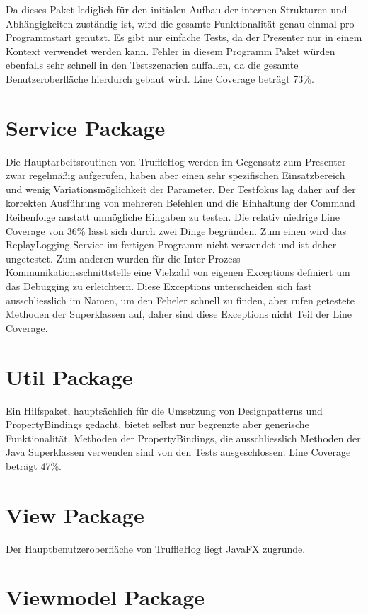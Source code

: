 Da dieses Paket lediglich für den initialen Aufbau der internen Strukturen und Abhängigkeiten zuständig ist, wird die gesamte Funktionalität genau einmal pro Programmstart genutzt. Es gibt nur einfache Tests, da der Presenter nur in einem Kontext verwendet werden kann. Fehler in diesem Programm Paket würden ebenfalls sehr schnell in den Testszenarien auffallen, da die gesamte Benutzeroberfläche hierdurch gebaut wird. Line Coverage beträgt 73\%.

\section{Service Package}

Die Hauptarbeitsroutinen von TruffleHog werden im Gegensatz zum Presenter zwar regelmäßig aufgerufen, haben aber einen sehr spezifischen Einsatzbereich und wenig Variationsmöglichkeit der Parameter. Der Testfokus lag daher auf der korrekten Ausführung von mehreren Befehlen und die Einhaltung der Command Reihenfolge anstatt unmögliche Eingaben zu testen. Die relativ niedrige Line Coverage von 36\% lässt sich durch zwei Dinge begründen. Zum einen wird das ReplayLogging Service im fertigen Programm nicht verwendet und ist daher ungetestet. Zum anderen wurden für die Inter-Prozess-Kommunikationsschnittstelle eine Vielzahl von eigenen Exceptions definiert um das Debugging zu erleichtern. Diese Exceptions unterscheiden sich fast ausschliesslich im Namen, um den Feheler schnell zu finden, aber rufen getestete Methoden der Superklassen auf, daher sind diese Exceptions nicht Teil der Line Coverage.

\section{Util Package}

Ein Hilfspaket, hauptsächlich für die Umsetzung von Designpatterns und PropertyBindings gedacht, bietet selbst nur begrenzte aber generische Funktionalität. Methoden der PropertyBindings, die ausschliesslich Methoden der Java Superklassen verwenden sind von den Tests ausgeschlossen. Line Coverage beträgt 47\%.

\section{View Package} %

Der Hauptbenutzeroberfläche von TruffleHog liegt JavaFX zugrunde.

\section{Viewmodel Package} %
